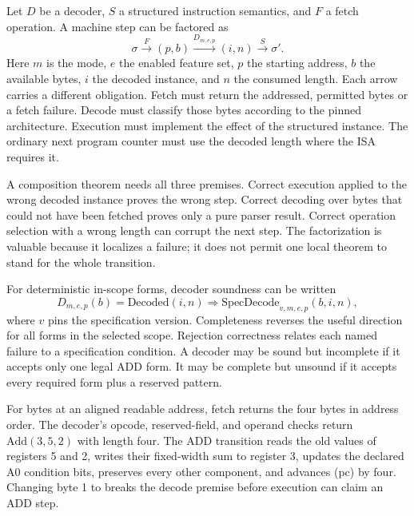 Let \(D\) be a decoder, \(S\) a structured instruction semantics, and \(F\) a
fetch operation. A machine step can be factored as
\[
  \sigma \mathrel{\mathop{\longrightarrow}\limits^{F}} (p,b)
  \mathrel{\mathop{\longrightarrow}\limits^{D_{m,e,p}}} (i,n)
  \mathrel{\mathop{\longrightarrow}\limits^{S}} \sigma'.
\]
Here \(m\) is the mode, \(e\) the enabled feature set, \(p\) the starting
address, \(b\) the available bytes, \(i\) the decoded instance, and \(n\) the
consumed length. Each arrow carries a different obligation. Fetch must return
the addressed, permitted bytes or a fetch failure. Decode must classify those
bytes according to the pinned architecture. Execution must implement the
effect of the structured instance. The ordinary next program counter must use
the decoded length where the ISA requires it.

A composition theorem needs all three premises. Correct execution applied to
the wrong decoded instance proves the wrong step. Correct decoding over bytes
that could not have been fetched proves only a pure parser result. Correct
operation selection with a wrong length can corrupt the next step. The
factorization is valuable because it localizes a failure; it does not permit
one local theorem to stand for the whole transition.

For deterministic in-scope forms, decoder soundness can be written
\[
  D_{m,e,p}(b)=\mathrm{Decoded}(i,n)
  \Longrightarrow
  \mathrm{SpecDecode}_{v,m,e,p}(b,i,n),
\]
where \(v\) pins the specification version. Completeness reverses the useful
direction for all forms in the selected scope. Rejection correctness relates
each named failure to a specification condition. A decoder may be sound but
incomplete if it accepts only one legal ADD form. It may be complete but
unsound if it accepts every required form plus a reserved pattern.

\begin{proofkit}[title={Reader proof for the A0 composed step}]
For bytes  at an aligned readable address, fetch returns the
four bytes in address order. The decoder's opcode, reserved-field, and
operand checks return \(\mathrm{Add}(3,5,2)\) with length four. The ADD
transition reads the old values of registers 5 and 2, writes their fixed-width
sum to register 3, updates the declared A0 condition bits, preserves every
other component, and advances (pc) by four. Changing byte 1 to 
breaks the decode premise before execution can claim an ADD step.
\end{proofkit}

